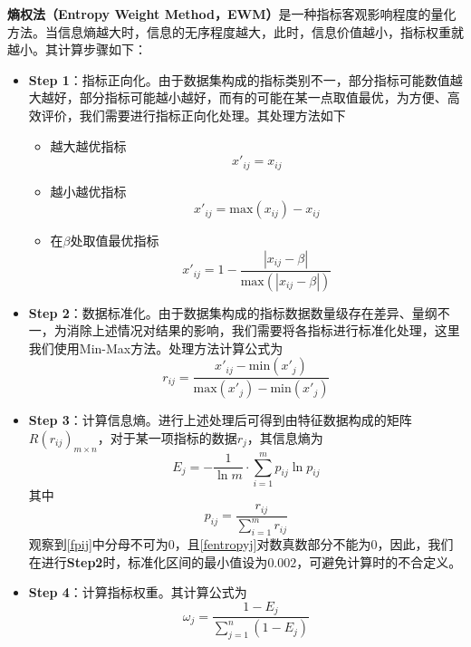 \documentclass{MathorCupModeling}
\begin{document}
	\textbf{熵权法（Entropy Weight Method，EWM）}是一种指标客观影响程度的量化方法。当信息熵越大时，信息的无序程度越大，此时，信息价值越小，指标权重就越小\textcolor{blue}{\cite{Paper:EWMO}}。其计算步骤如下：
	\begin{itemize}
		\item \textbf{Step 1}：指标正向化。由于数据集构成的指标类别不一，部分指标可能数值越大越好，部分指标可能越小越好，而有的可能在某一点取值最优，为方便、高效评价，我们需要进行指标正向化处理\textcolor{blue}{\cite{Paper:EWMT}}。其处理方法如下
		\begin{itemize}
			\item {\heiti 越大越优指标}
			\begin{equation}
				x'_{ij}=x_{ij} \label{fmax}
			\end{equation}
			\item {\heiti 越小越优指标}
			\begin{equation}
				x'_{ij}=\mathrm{max}\left(x_{ij}\right)-x_{ij} \label{fmin}
			\end{equation}
			\item {\heiti 在$\beta$处取值最优指标}
			\begin{equation}
				x'_{ij}=1-\frac{\left|x_{ij}-\beta\right|}{\mathrm{max}\left(\left|x_{ij}-\beta\right|\right)} \label{fmid}
			\end{equation}
		\end{itemize}
		\item \textbf{Step 2}：数据标准化。由于数据集构成的指标数据数量级存在差异、量纲不一，为消除上述情况对结果的影响，我们需要将各指标进行标准化处理，这里我们使用Min-Max方法。处理方法计算公式为
		\begin{equation}
			r_{ij}=\frac{x'_{ij}-\mathrm{min}\left(x'_{j}\right)}{\mathrm{max}\left(x'_{j}\right)-\mathrm{min}\left(x'_{j}\right)} \label{Min-Max}
		\end{equation}
		\item \textbf{Step 3}：计算信息熵。进行上述处理后可得到由特征数据构成的矩阵$R\left(r_{ij}\right)_{m\times n}$，对于某一项指标的数据$r_j$，其信息熵为
		\begin{equation}
			E_j=-\frac{1}{\ln m}\cdot\sum\limits_{i=1}^{m}p_{ij}\ln p_{ij} \label{fentropyj}
		\end{equation}
		其中
		\begin{equation}
			p_{ij}=\frac{r_{ij}}{\sum\limits_{i=1}^{m}r_{ij}} \label{fpij}
		\end{equation}
		观察到\textcolor{blue}{\eqref{fpij}}中分母不可为$0$，且\textcolor{blue}{\eqref{fentropyj}}对数真数部分不能为$0$，因此，我们在进行\textbf{Step2}时，标准化区间的最小值设为$0.002$，可避免计算时的不合定义。
		\item \textbf{Step 4}：计算指标权重。其计算公式为
		\begin{equation}
			\omega_j=\frac{1-E_j}{\sum\limits_{j=1}^{n}\left(1-E_j\right)} \label{fwj}
		\end{equation}
	\end{itemize}
\end{document}
